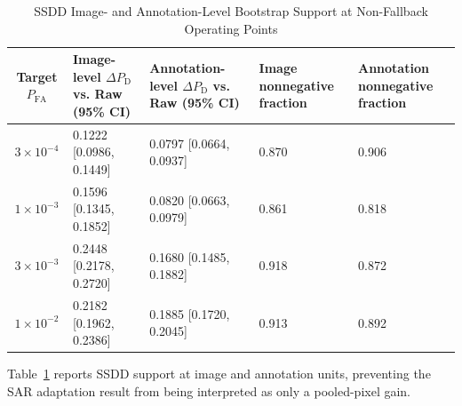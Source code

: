 \documentclass[journal]{IEEEtran}
\begin{document}
\begin{table}[!t]
\caption{SSDD Image- and Annotation-Level Bootstrap Support at Non-Fallback Operating Points}
\label{tab:ssdd-unit-bootstrap}
\centering
\scriptsize
\renewcommand{\arraystretch}{1.12}
\setlength{\tabcolsep}{3pt}
\begin{tabular}{@{}cp{}p{}p{}p{}@{}}
\toprule
Target $P_{\mathrm{FA}}$ & Image-level $\Delta P_{\mathrm{D}}$ vs. Raw (95\% CI) & Annotation-level $\Delta P_{\mathrm{D}}$ vs. Raw (95\% CI) & Image nonnegative fraction & Annotation nonnegative fraction \\
\midrule
$3{\times}10^{-4}$ & 0.1222 [0.0986, 0.1449] & 0.0797 [0.0664, 0.0937] & 0.870 & 0.906 \\
$1{\times}10^{-3}$ & 0.1596 [0.1345, 0.1852] & 0.0820 [0.0663, 0.0979] & 0.861 & 0.818 \\
$3{\times}10^{-3}$ & 0.2448 [0.2178, 0.2720] & 0.1680 [0.1485, 0.1882] & 0.918 & 0.872 \\
$1{\times}10^{-2}$ & 0.2182 [0.1962, 0.2386] & 0.1885 [0.1720, 0.2045] & 0.913 & 0.892 \\
\bottomrule
\end{tabular}
\vspace{0.35em}
\parbox{0.94\textwidth}{\scriptsize Table~\ref{tab:ssdd-unit-bootstrap} reports SSDD support at image and annotation units, preventing the SAR adaptation result from being interpreted as only a pooled-pixel gain.}
\end{table}
\end{document}
